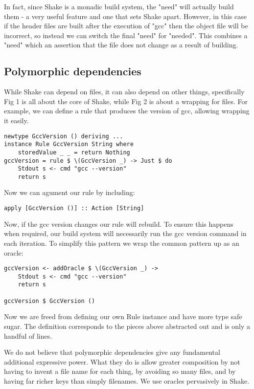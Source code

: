 In fact, since Shake is a monadic build system, the \lst"need" will actually build them - a very useful feature and one that sets Shake apart. However, in this case if the header files are built after the execution of \lst"gcc" then the object file will be incorrect, so instead we can switch the final \lst"need" for \lst"needed". This combines a \lst"need" which an assertion that the file does not change as a result of building.

\subsection{Polymorphic dependencies}

While Shake can depend on files, it can also depend on other things, specifically Fig 1 is all about the core of Shake, while Fig 2 is about a wrapping for files. For example, we can define a rule that produces the version of gcc, allowing wrapping it easily.

\begin{lstlisting}
newtype GccVersion () deriving ...
instance Rule GccVersion String where
    storedValue _ _ = return Nothing
gccVersion = rule $ \(GccVersion _) -> Just $ do
    Stdout s <- cmd "gcc --version"
    return s
\end{lstlisting}

Now we can agument our rule by including:

\begin{lstlisting}
apply [GccVersion ()] :: Action [String]
\end{lstlisting}

Now, if the gcc version changes our rule will rebuild. To ensure this happens when required, our build system will necessarily run the gcc version command in each iteration. To simplify this pattern we wrap the common pattern up as an oracle:

\begin{lstlisting}
gccVersion <- addOracle $ \(GccVersion _) ->
    Stdout s <- cmd "gcc --version"
    return s

gccVersion $ GccVersion ()
\end{lstlisting}

Now we are freed from defining our own Rule instance and have more type safe sugar. The definition corresponds to the pieces above abstracted out and is only a handful of lines.

We do not believe that polymorphic dependencies give any fundamental additional expressive power. What they do is allow greater composition by not having to invent a file name for each thing, by avoiding so many files, and by having far richer keys than simply filenames. We use oracles pervasively in Shake.

